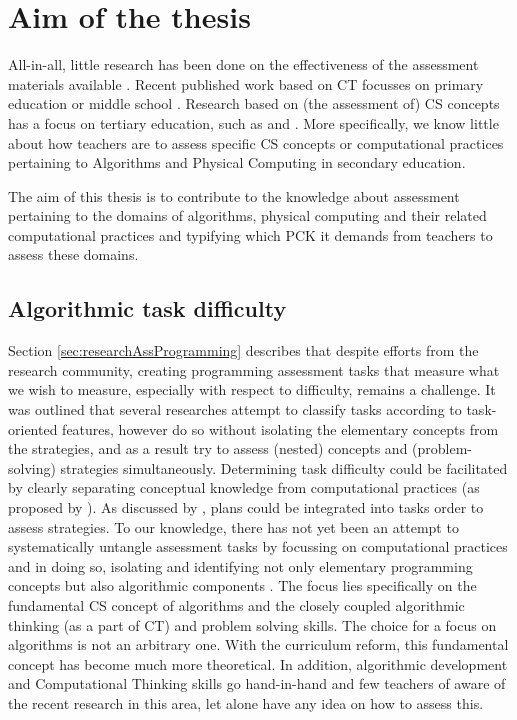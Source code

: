 \section{Aim of the thesis}\label{sec:aim}
All-in-all, little research has been done on the effectiveness of the assessment materials available \cite{Yadav2016}. Recent published work based on CT focusses on primary education or middle school \cite{LyeKoh2014}. Research based on (the assessment of) CS concepts has a focus on tertiary education, such as \cite{McCracken2001} and \cite{2010TewGuzdial}. More specifically, we know little about how teachers are to assess specific CS concepts or computational practices pertaining to Algorithms and Physical Computing in secondary education.

The aim of this thesis is to contribute to the knowledge about assessment pertaining to the domains of algorithms, physical computing and their related computational practices and typifying which PCK it demands from teachers to assess these domains.

\subsection*{Algorithmic task difficulty}
Section \ref{sec:researchAssProgramming} describes that despite efforts from the research community, creating programming assessment tasks that measure what we wish to measure, especially with respect to difficulty, remains a challenge. It was outlined that several researches attempt to classify tasks according to task-oriented features, however do so without isolating the elementary concepts from the strategies, and as a result try to assess (nested) concepts and (problem-solving) strategies simultaneously. Determining task difficulty could be facilitated by clearly separating conceptual knowledge from computational practices (as proposed by \citeauthor{BrennanResnick2012}). As discussed by \citeauthor{deRaadt2009teachingPlans}, plans could be integrated into tasks order to assess strategies. To our knowledge, there has not yet been an attempt to systematically untangle assessment tasks by focussing on computational practices and in doing so, isolating and identifying not only elementary programming concepts but also algorithmic components \cite{deRaadt2008}. The focus lies specifically on the fundamental CS concept of algorithms and the closely coupled algorithmic thinking (as a part of CT) and problem solving skills. The choice for a focus on algorithms is not an arbitrary one. With the curriculum reform, this fundamental concept has become much more theoretical. In addition, algorithmic development and Computational Thinking skills go hand-in-hand and few teachers of aware of the recent research in this area, let alone have any idea on how to assess this.

